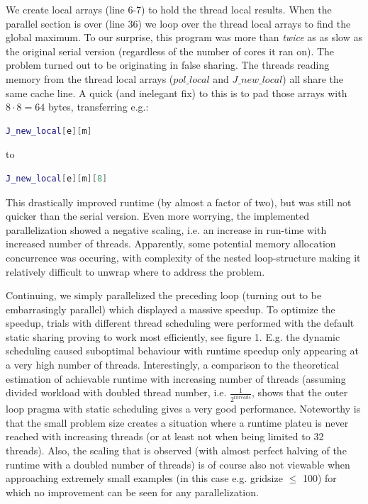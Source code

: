 \documentclass[12pt]{article}
\begin{document}
We create local arrays (line 6-7) to hold the thread local results. When the parallel section is over (line 36) we loop over the thread local arrays to find the global maximum. To our surprise,  this program was more than \emph{twice} as as slow as the original serial version (regardless of the number of cores it ran on). The problem turned out to be originating in false sharing. The threads reading memory from the thread local arrays ($pol\_local$ and $J\_new\_local$) all share the same cache line. A quick (and inelegant fix) to this is to pad those arrays with $8\cdot8=64$ bytes, transferring e.g.:
\begin{lstlisting}[language=bash]
  J_new_local[e][m]
\end{lstlisting}
to
\begin{lstlisting}[language=bash]
  J_new_local[e][m][8]
\end{lstlisting}
This drastically improved runtime (by almost a factor of two), but was still not quicker than the serial version. Even more worrying, the implemented parallelization showed a negative scaling, i.e. an increase in run-time with increased number of threads. Apparently, some potential memory allocation concurrence was occuring, with complexity of the nested loop-structure making it relatively difficult to unwrap where to address the problem. 


Continuing, we simply parallelized the preceding loop (turning out to be embarrasingly parallel) which displayed a massive speedup. To optimize the speedup, trials with different thread scheduling were performed with the default static sharing proving to work most efficiently, see figure 1. E.g. the dynamic scheduling caused suboptimal behaviour with runtime speedup only appearing at a very high number of threads. Interestingly, a comparison to the theoretical estimation of achievable runtime with increasing number of threads (assuming divided workload with doubled thread number, i.e. $\frac{1}{2^{threads}}$, shows that the outer loop pragma with static scheduling gives a very good performance. Noteworthy is that the small problem size creates a situation where a runtime plateu is never reached with increasing threads (or at least not when being limited to 32 threads). Also, the scaling that is observed (with almost perfect halving of the runtime with a doubled number of threads) is of course also not viewable when approaching extremely small examples (in this case e.g. gridsize $\leq$ 100) for which no improvement can be seen for any parallelization. 
\end{document}
